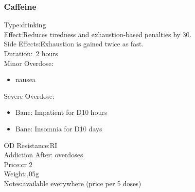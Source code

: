 \subsubsection{Caffeine}
Type:\tab drinking\\
Effect:\tab Reduces tiredness and exhaustion-based penalties by 30.\\
Side Effects:\tab Exhaustion is gained twice as fast. \\
Duration:\tab ~2 hours\\
Minor Overdose:\\
\begin{itemize}
	\setlength\itemsep{-8mm}
	\vspace{-12mm}
	\item nausea
\end{itemize}
Severe Overdose:\\
\begin{itemize}
	\setlength\itemsep{-8mm}
	\vspace{-12mm}
	\item Bane: Impatient for D10 hours
	\item Bane: Insomnia for D10 days
\end{itemize}
OD Resistance:\tab RI\\
Addiction After: overdoses\\
Price:\tab cr 2\\
Weight:,05g\\
Notes:\tab available everywhere (price per 5 doses)


